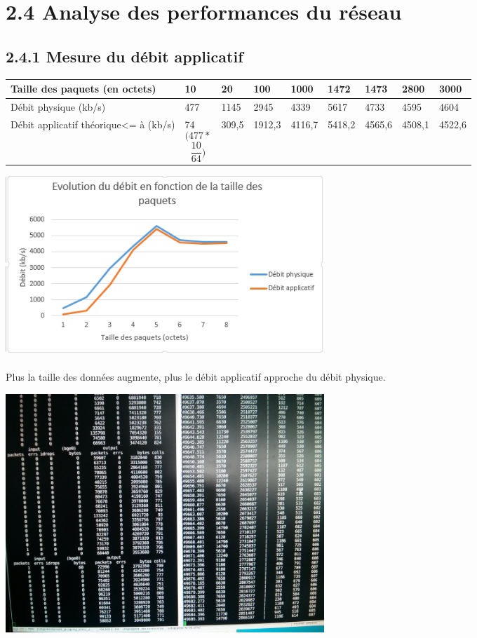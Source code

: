 \documentclass{report}
\begin{document}
\section*{2.4 Analyse des performances du réseau}
\subsection*{2.4.1 Mesure du débit applicatif}

\begin{tabular}{|p{2cm}|p{1cm}|p{1cm}|p{1cm}|p{1cm}|p{1cm}|p{1cm}|p{1cm}|p{1cm}|}

\hline
Taille des paquets (en octets) & 10 & 20 & 100 & 1000 & 1472 & 1473 & 2800 & 3000 \\
\hline
Débit physique (kb/s) & 477 & 1145 & 2945 & 4339 & 5617 & 4733 & 4595 & 4604 \\
\hline
Débit applicatif théorique<= à (kb/s) & 74 \[(477*\]\[\frac{10}{64})\] & 309,5 & 1912,3 & 4116,7 & 5418,2 & 4565,6 & 4508,1 & 4522,6 \\
\hline
\end{tabular}

\includegraphics[width=12cm]{debit.png}\\

\paragraph{}Plus la taille des données augmente, plus le débit applicatif approche du débit physique.


\includegraphics[width=12cm]{screen8.jpg}\\
\end{document}
